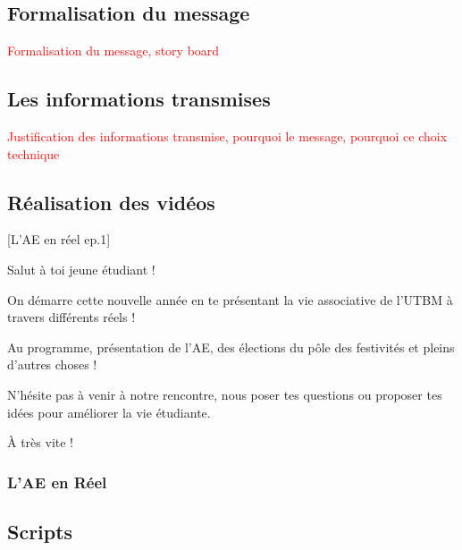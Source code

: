 
\subsection{Formalisation du message}

\textcolor{red}{Formalisation du message, story board}



\subsection{Les informations transmises}

\textcolor{red}{Justification des informations transmise, pourquoi le message, pourquoi ce choix technique}


\subsection{Réalisation des vidéos}


[L'AE en réel ep.1]

Salut à toi jeune étudiant !

On démarre cette nouvelle année en te présentant la vie associative de l'UTBM à travers différents réels !

Au programme, présentation de l'AE, des élections du pôle des festivités et pleins d'autres choses !

N'hésite pas à venir à notre rencontre, nous poser tes questions ou proposer tes idées pour améliorer la vie étudiante.

À très vite !


\subsubsection{L'AE en Réel}

\subsection{Scripts}\label{subsec:scripts}

\begin{dialogue}
     \lipsum[1]
     \lipsum[2]
\end{dialogue}